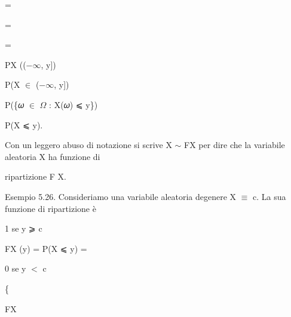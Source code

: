 \documentclass[a4paper,portrait,12pt]{article}
\begin{document}
=


=


=





\begin{flushleft}
PX (($-$$\infty$, y])
\end{flushleft}


\begin{flushleft}
P(X $\in$ ($-$$\infty$, y])
\end{flushleft}


\begin{flushleft}
P(\{𝜔 $\in$ $\Omega$ : X(𝜔) ⩽ y\})
\end{flushleft}


\begin{flushleft}
P(X ⩽ y).
\end{flushleft}





\begin{flushleft}
Con un leggero abuso di notazione si scrive X $\sim$ FX per dire che la variabile aleatoria X ha funzione di
\end{flushleft}


\begin{flushleft}
ripartizione F X.
\end{flushleft}


\begin{flushleft}
Esempio 5.26. Consideriamo una variabile aleatoria degenere X $\equiv$ c. La sua funzione di ripartizione \`{e}
\end{flushleft}


\begin{flushleft}
1 se y ⩾ c
\end{flushleft}


\begin{flushleft}
FX (y) = P(X ⩽ y) =
\end{flushleft}


\begin{flushleft}
0 se y $<$ c
\end{flushleft}





\{





\begin{flushleft}
FX
\end{flushleft}
\end{document}
